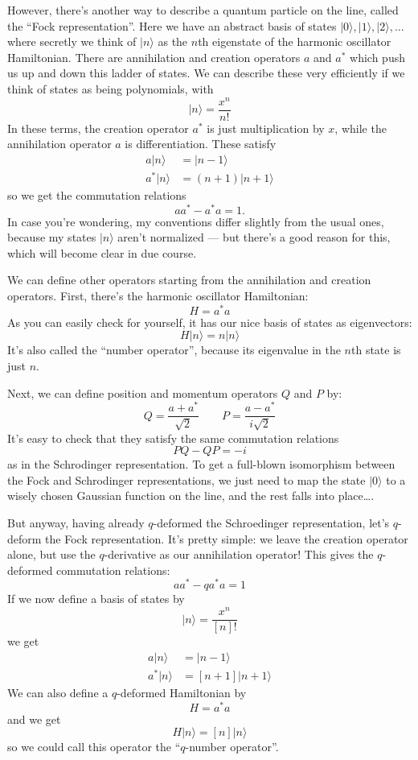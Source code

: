 \documentclass{article}
\begin{document}
However, there's another way to describe a quantum particle on the line,
called the ``Fock representation''. Here we have an abstract basis of
states \(\vert 0\rangle, \vert 1\rangle, \vert 2\rangle, \ldots\) where
secretly we think of \(\vert n\rangle\) as the \(n\)th eigenstate of the
harmonic oscillator Hamiltonian. There are annihilation and creation
operators \(a\) and \(a^*\) which push us up and down this ladder of
states. We can describe these very efficiently if we think of states as
being polynomials, with \[\vert n\rangle = \frac{x^n}{n!}\] In these
terms, the creation operator \(a^*\) is just multiplication by \(x\),
while the annihilation operator \(a\) is differentiation. These satisfy
\[
  \begin{aligned}
    a\vert n\rangle &= \vert n-1\rangle
  \\a^*\vert n\rangle &= (n+1) \vert n+1\rangle
  \end{aligned}
\] so we get the commutation relations \[a a^* - a^* a = 1.\] In case
you're wondering, my conventions differ slightly from the usual ones,
because my states \(\vert n\rangle\) aren't normalized --- but there's a
good reason for this, which will become clear in due course.

We can define other operators starting from the annihilation and
creation operators. First, there's the harmonic oscillator Hamiltonian:
\[H = a^* a\] As you can easily check for yourself, it has our nice
basis of states as eigenvectors: \[H\vert n\rangle = n \vert n\rangle\]
It's also called the ``number operator'', because its eigenvalue in the
\(n\)th state is just \(n\).

Next, we can define position and momentum operators \(Q\) and \(P\) by:
\[Q=\frac{a+a^*}{\sqrt{2}} \qquad P=\frac{a-a^*}{i\sqrt2}\] It's easy to
check that they satisfy the same commutation relations \[PQ - QP = -i\]
as in the Schrodinger representation. To get a full-blown isomorphism
between the Fock and Schrodinger representations, we just need to map
the state \(\vert 0\rangle\) to a wisely chosen Gaussian function on the
line, and the rest falls into place\ldots.

But anyway, having already \(q\)-deformed the Schroedinger
representation, let's \(q\)-deform the Fock representation. It's pretty
simple: we leave the creation operator alone, but use the
\(q\)-derivative as our annihilation operator! This gives the
\(q\)-deformed commutation relations: \[a a^* - q a^* a = 1\] If we now
define a basis of states by \[\vert n\rangle = \frac{x^n}{[n]!}\] we get
\[
  \begin{aligned}
    a\vert n\rangle &= \vert n-1\rangle
  \\a^*\vert n\rangle &= [n+1] \vert n+1\rangle
  \end{aligned}
\] We can also define a \(q\)-deformed Hamiltonian by \[H = a^* a\] and
we get \[H\vert n\rangle = [n] \vert n\rangle\] so we could call this
operator the ``\(q\)-number operator''.
\end{document}
